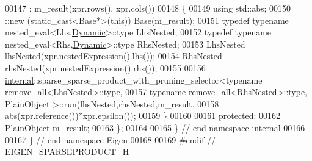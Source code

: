 \begin{DoxyCode}
00147     : m\_result(xpr.rows(), xpr.cols())
00148   \{
00149     \textcolor{keyword}{using} std::abs;
00150     ::new (static\_cast<Base*>(\textcolor{keyword}{this})) Base(m\_result);
00151     typedef typename nested\_eval<Lhs,\hyperlink{namespace_eigen_ad81fa7195215a0ce30017dfac309f0b2}{Dynamic}>::type LhsNested;
00152     typedef typename nested\_eval<Rhs,\hyperlink{namespace_eigen_ad81fa7195215a0ce30017dfac309f0b2}{Dynamic}>::type RhsNested;
00153     LhsNested lhsNested(xpr.nestedExpression().lhs());
00154     RhsNested rhsNested(xpr.nestedExpression().rhs());
00155 
00156     \hyperlink{namespaceinternal}{internal}::sparse\_sparse\_product\_with\_pruning\_selector<typename remove\_all<LhsNested>::type,
00157                                                           typename remove\_all<RhsNested>::type, PlainObject
      >::run(lhsNested,rhsNested,m\_result,
00158                                                                                                            
             abs(xpr.reference())*xpr.epsilon());
00159   \}
00160 
00161 protected:
00162   PlainObject m\_result;
00163 \};
00164 
00165 \} \textcolor{comment}{// end namespace internal}
00166 
00167 \} \textcolor{comment}{// end namespace Eigen}
00168 
00169 \textcolor{preprocessor}{#endif // EIGEN\_SPARSEPRODUCT\_H}
\end{DoxyCode}
